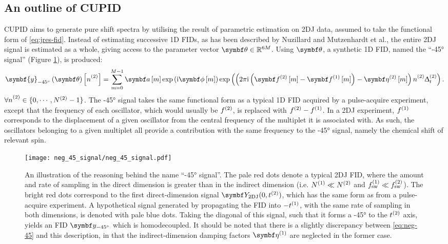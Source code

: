\subsection{An outline of \acs{CUPID}}
\ac{CUPID} aims to generate pure shift spectra by utilising the result of
parametric estimation on \ac{2DJ} data, assumed to take the functional form of
\eqref{eq:jres-fid}.
Instead of estimating successive \ac{1D} \acp{FID}, as has been described by
Nuzillard and Mutzenhardt et al., the entire \ac{2DJ} signal is estimated as a
whole, giving access to the parameter vector $\bth \in \mathbb{R}^{6M}$. Using
$\bth$, a synthetic \ac{1D} \ac{FID}, named the ``\ang{-45} signal'' (Figure
\ref{fig:neg-45}), is produced:
\begin{equation}
    \symbf{y}_{\ang{-45}}\left(\bth\right)\left[ \ntwo \right] =
        \sum_{m=0}^{M-1} \bdam \exp \left(\iu \bdphim \right)
        \exp\left(
            \left(
                2 \pi \iu \left(\bdftwom - \bdfonem\right)
                - \bdetatwom
            \right) \ntwo \Dttwo
        \right).
    \label{eq:neg-45}
\end{equation}
$\forall \ntwo \in \lbrace 0, \cdots, \Ntwo - 1 \rbrace$. The \ang{-45} signal
takes the same functional form as a typical \ac{1D}
\ac{FID} acquired by a pulse-acquire experiment, except that the frequency of
each oscillator, which would usually be $f^{(2)}$, is replaced with $f^{(2)} -
f^{(1)}$. In a \ac{2DJ} experiment, $f^{(1)}$ corresponds to the displacement of a
given oscillator from the central frequency of the multiplet it is associated
with. As such, the oscillators belonging to a given multiplet all provide
a contribution with the same frequency to the \ang{-45} signal, namely the
chemical shift of relevant spin.
\begin{figure}
    \centering
    \texttt{[image: neg\_45\_signal/neg\_45\_signal.pdf]}
    \caption[
        An illustration of the reasoning behind the name ``\ang{-45}
        signal''.
    ]{
        An illustration of the reasoning behind the name ``\ang{-45}
        signal''. The pale red dots denote a typical \ac{2DJ} \ac{FID}, where
        the amount and rate of sampling in the direct dimension is greater than
        in the indirect dimension (i.e. $N^{(1)} \ll N^{(2)}$ and $f_{\mathrm{sw}}^{(1)} \ll
        f_{\mathrm{sw}}^{(2)}$). The bright red dots correspond to the first direct-dimension
        signal $\bY_{\text{2DJ}}(0, \ttwo)$, which has the same form as
         from a pulse-acquire experiment. A hypothetical signal
        generated by propagating the \ac{FID} into $-t^{(1)}$, with the same rate
        of sampling in both dimensions, is denoted with pale blue dots. Taking
        the diagonal of this signal, such that it forms a \ang{-45} to the
        $t^{(2)}$ axis, yields an \ac{FID} $\by_{\ang{-45}}$  which is
        homodecoupled. It should be noted that there is a slightly discrepancy
        between \eqref{eq:neg-45} and this description, in that the
        indirect-dimension damping factors $\bdetaone$ are neglected in the
        former case.
    }
    \label{fig:neg-45}
\end{figure}


